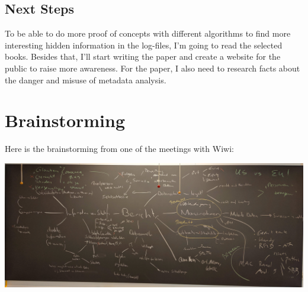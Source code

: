 \documentclass{article}
\begin{document}
\subsection{Next Steps}
To be able to do more proof of concepts with different algorithms to find more interesting hidden information in the log-files, I'm going to read the selected books. Besides that, I'll start writing the paper and create a website for the public to raise more awareness. For the paper, I also need to research facts about the danger and misuse of metadata analysis.
\newpage
\section{Brainstorming}
Here is the brainstorming from one of the meetings with Wiwi:

\includegraphics[width=\textwidth]{brainstorming}
 
\end{document}
